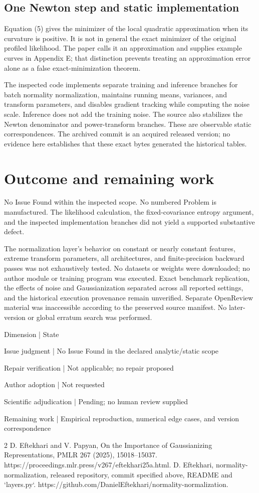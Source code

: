 \documentclass[10pt]{article}
\begin{document}
\subsection*{One Newton step and static implementation}
Equation (5) gives the minimizer of the local quadratic approximation when its curvature is positive. It is not in general the exact minimizer of the original profiled likelihood. The paper calls it an approximation and supplies example curves in Appendix E; that distinction prevents treating an approximation error alone as a false exact-minimization theorem.\par
The inspected code implements separate training and inference branches for batch normality normalization, maintains running means, variances, and transform parameters, and disables gradient tracking while computing the noise scale. Inference does not add the training noise. The source also stabilizes the Newton denominator and power-transform branches. These are observable static correspondences. The archived commit is an acquired released version; no evidence here establishes that these exact bytes generated the historical tables.\par
\section*{Outcome and remaining work}
No Issue Found within the inspected scope. No numbered Problem is manufactured. The likelihood calculation, the fixed-covariance entropy argument, and the inspected implementation branches did not yield a supported substantive defect.\par
The normalization layer’s behavior on constant or nearly constant features, extreme transform parameters, all architectures, and finite-precision backward passes was not exhaustively tested. No datasets or weights were downloaded; no author module or training program was executed. Exact benchmark replication, the effects of noise and Gaussianization separated across all reported settings, and the historical execution provenance remain unverified. Separate OpenReview material was inaccessible according to the preserved source manifest. No later-version or global erratum search was performed.\par
Dimension | State\par
Issue judgment | No Issue Found in the declared analytic/static scope\par
Repair verification | Not applicable; no repair proposed\par
Author adoption | Not requested\par
Scientific adjudication | Pending; no human review supplied\par
Remaining work | Empirical reproduction, numerical edge cases, and version correspondence\par
2 D. Eftekhari and V. Papyan, On the Importance of Gaussianizing Representations, PMLR 267 (2025), 15018–15037. https://proceedings.mlr.press/v267/eftekhari25a.html. D. Eftekhari, normality-normalization, released repository, commit specified above, README and `layers.py`. https://github.com/DanielEftekhari/normality-normalization.\par
\end{document}
